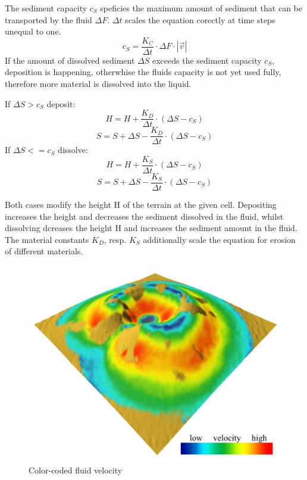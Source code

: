 The sediment capacity $c_S$ speficies the maximum amount of sediment that can be transported by the fluid $\Delta F$. $\Delta t$ scales the equation corectly at time steps unequal to one.  
$$ c_S = \frac{K_C}{\Delta t} \cdot \Delta F  \cdot |\vec{v}|
$$
If the amount of dissolved sediment $\Delta S$ exceeds the sediment capacity $c_S$, deposition is happening, otherwhise the fluids capacity is not yet used fully, therefore more material is dissolved into the liquid. 

If $\Delta S > c_S$ deposit: 
$$
H = H + \frac{K_D}{\Delta t} \cdot ( \Delta S - c_S )
$$
$$
S = S + \Delta S - \frac{K_D}{\Delta t} \cdot (\Delta S - c_S)
$$
If $\Delta S <= c_S$ dissolve: 
$$
H = H + \frac{K_S}{\Delta t} \cdot ( \Delta S - c_S )
$$
$$
S = S + \Delta S - \frac{K_S}{\Delta t} \cdot (\Delta S - c_S)
$$

Both cases modify the height H of the terrain at the given cell. Depositing increases the height and decreases the sediment dissolved in the fluid, whilst dissolving dcreases the height H and increases the sediment amount in the fluid. The material constants $K_D$, resp. $K_S$ additionally scale the equation for erosion of different materials. 

\begin{figure}
	\centering
	\includegraphics[width=\linewidth]{NWD05/hydraulic_errosion_c}
	\caption{Color-coded fluid velocity}
	\label{fig:calc_acceleration}
\end{figure}


